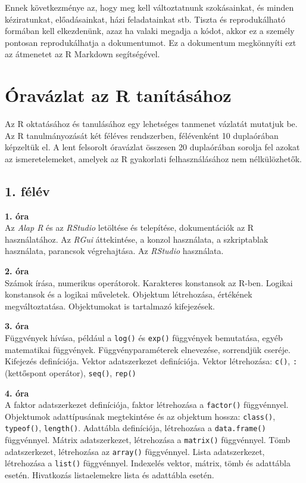 \documentclass[
]{book}
\begin{document}
Ennek következménye az, hogy meg kell változtatnunk szokásainkat, és minden kéziratunkat, előadásainkat, házi feladatainkat stb. Tiszta és reprodukálható formában kell elkezdenünk, azaz ha valaki megadja a kódot, akkor ez a személy pontosan reprodukálhatja a dokumentumot. Ez a dokumentum megkönnyíti ezt az átmenetet az R Markdown segítségével.

\hypertarget{oravazlat-az-r-tanitasahoz}{%
\chapter{Óravázlat az R tanításához}\label{oravazlat-az-r-tanitasahoz}}

Az R oktatásához és tanulásához egy lehetséges tanmenet vázlatát
mutatjuk be. Az R tanulmányozását két féléves rendszerben, félévenként
10 duplaórában képzeltük el. A lent felsorolt óravázlat összesen 20
duplaórában sorolja fel azokat az ismeretelemeket, amelyek az R
gyakorlati felhasználásához nem nélkülözhetők.

\hypertarget{felev-1}{%
\section*{1. félév}\label{felev-1}}

\textbf{1. óra}\\
Az \emph{Alap R} és az \emph{RStudio} letöltése és telepítése, dokumentációk az
R használatához. Az \emph{RGui} áttekintése, a konzol használata, a
szkriptablak használata, parancsok végrehajtása. Az \emph{RStudio}
használata.

\textbf{2. óra}\\
Számok írása, numerikus operátorok. Karakteres konstansok az R-ben.
Logikai konstansok és a logikai műveletek. Objektum létrehozása, értékének megváltoztatása. Objektumokat is tartalmazó kifejezések.

\textbf{3. óra}\\
Függvények hívása, például a \texttt{log()} és \texttt{exp()} függvények bemutatása, egyéb matematikai függvények. Függvényparaméterek elnevezése, sorrendjük cseréje. Kifejezés definíciója. Vektor adatszerkezet definíciója. Vektor létrehozása: \texttt{c()}, \texttt{:} (kettőspont operátor), \texttt{seq()}, \texttt{rep()}

\textbf{4. óra}\\
A faktor adatszerkezet definíciója, faktor létrehozása a \texttt{factor()} függvénnyel. Objektumok adattípusának megtekintése és az objektum hossza: \texttt{class()}, \texttt{typeof()}, \texttt{length()}. Adattábla definíciója, létrehozása a \texttt{data.frame()} függvénnyel. Mátrix adatszerkezet, létrehozása a \texttt{matrix()} függvénnyel. Tömb adatszerkezet, létrehozása az \texttt{array()} függvénnyel. Lista adatszerkezet, létrehozása a \texttt{list()} függvénnyel. Indexelés vektor, mátrix, tömb és adattábla esetén. Hivatkozás listaelemekre lista és adattábla esetén.
\end{document}
